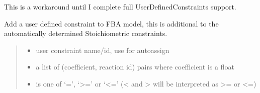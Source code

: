 \documentclass[letterpaper,12pt,english]{sphinxmanual}
\begin{document}
\begin{fulllineitems}
\begin{fulllineitems}
\end{fulllineitems}


\begin{fulllineitems}
\label{\detokenize{api/core:cbmpy.CBModel.Model.copyUserDefinedConstraintsToUserConstraints}}
\pysigstartsignatures
\pysiglinewithargsret
{}
{}
{}
\pysigstopsignatures
\sphinxAtStartPar
This is a workaround until I complete full UserDefinedConstraints support.

\end{fulllineitems}


\begin{fulllineitems}
\label{\detokenize{api/core:cbmpy.CBModel.Model.addUserConstraint}}
\pysigstartsignatures
\pysiglinewithargsret
{}
{\sphinxparamcomma {}\sphinxparamcomma {}\sphinxparamcomma {}}
{}
\pysigstopsignatures
\sphinxAtStartPar
Add a user defined constraint to FBA model, this is additional to the automatically determined Stoichiometric constraints.
\begin{quote}\begin{description}
\begin{itemize}
\item {} 
\sphinxAtStartPar
{} \textendash{} user constraint name/id, use  for auto\sphinxhyphen{}assign

\item {} 
\sphinxAtStartPar
{} \textendash{} a list of (coefficient, reaction id) pairs where coefficient is a float

\item {} 
\sphinxAtStartPar
{} \textendash{} is one of ‘=’, ‘\textgreater{}=’ or ‘\textless{}=’ (\textless{} and \textgreater{} will be interpreted as \textgreater{}= or \textless{}=)


\end{itemize}
\end{description}
\end{quote}
\end{fulllineitems}
\end{fulllineitems}
\end{document}
